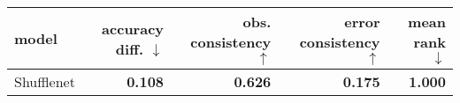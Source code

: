\begin{tabular}{lrrrr}
\toprule
     model & accuracy diff. $\downarrow$ & obs. consistency $\uparrow$ & error consistency $\uparrow$ & mean rank $\downarrow$ \\
\midrule
Shufflenet &              \textbf{0.108} &              \textbf{0.626} &               \textbf{0.175} &         \textbf{1.000} \\
\bottomrule
\end{tabular}

